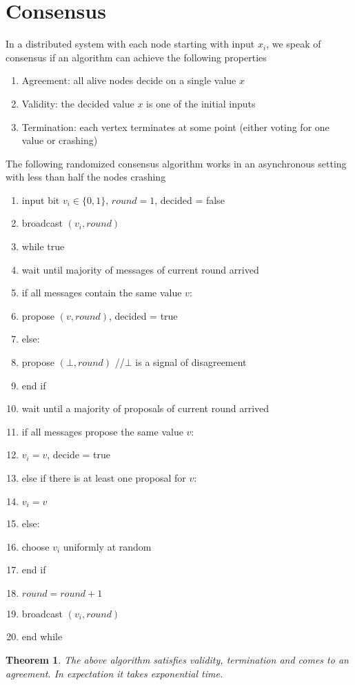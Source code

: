 \documentclass[a4paper, 12pt]{article}
\theoremstyle{plain}
\newtheorem{theorem}{Theorem}[section] %
\theoremstyle{definition}
\theoremstyle{lemma}
\theoremstyle{remark}
\theoremstyle{corollary}
\theoremstyle{example}
\begin{document}
	\section{Consensus}
	In a distributed system with each node starting with input $x_i$, we speak of consensus if an algorithm can achieve the following properties 
	\begin{enumerate}
		\item Agreement: all alive nodes decide on a single value $x$
		\item Validity: the decided value $x$ is one of the initial inputs
		\item Termination: each vertex terminates at some point (either voting for one value or crashing)
	\end{enumerate}
	The following randomized consensus algorithm works in an asynchronous setting with less than half the nodes crashing
	\begin{enumerate}
		\item input bit $v_i \in \{0,1\}$, $round = 1$, decided = false
		\item broadcast $(v_i, round)$
		\item while true
		\item wait until majority of messages of current round arrived
		\item if all messages contain the same value $v$:  
		\item propose $(v,round)$, decided = true
		\item else: 
		\item propose $(\bot, round)$ //$\bot$ is a signal of disagreement
		\item end if 
		\item wait until a majority of proposals of current round arrived
		\item if all messages propose the same value $v$:
		\item $v_i = v$, decide = true
		\item else if there is at least one proposal for $v$:
		\item $v_i = v$
		\item else:
		\item choose $v_i$ uniformly at random
		\item end if
		\item $round = round +1$
		\item broadcast $(v_i,round)$
		\item end while
	\end{enumerate}
	\begin{theorem}
		The above algorithm satisfies validity, termination and comes to an agreement. In expectation it takes exponential time.
	\end{theorem}
\end{document}
